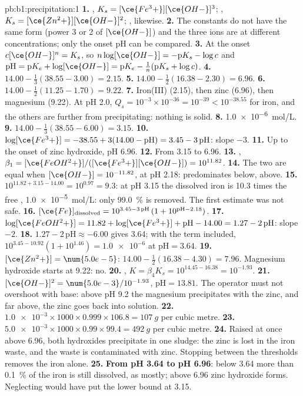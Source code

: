 \begin{solution}{pb:b1:precipitation:1}
\textbf{1.} , $K_s = [\ce{Fe^3+}][\ce{OH-}]^3$;
, $K_s = [\ce{Zn^2+}][\ce{OH-}]^2$;
, likewise.
\textbf{2.} The constants do not have the same form (power 3 or 2 of
$[\ce{OH-}]$) and the three ions are at different concentrations; only
the onset pH can be compared.
\textbf{3.} At the onset $c[\ce{OH-}]^n = K_s$, so $n\log[\ce{OH-}] =
-\mathrm{p}K_s - \log c$ and $\mathrm{pH} = \mathrm{p}K_e +
\log[\ce{OH-}] = \mathrm{p}K_e - \frac1n(\mathrm{p}K_s + \log c)$.
\textbf{4.} $14.00 - \frac13(38.55 - 3.00) = 2.15$.
\textbf{5.} $14.00 - \frac12(16.38 - 2.30) = 6.96$.
\textbf{6.} $14.00 - \frac12(11.25 - 1.70) = 9.22$.
\textbf{7.} Iron(III) (2.15), then zinc (6.96), then magnesium (9.22). At
pH 2.0, $Q_s = 10^{-3} \times 10^{-36} = 10^{-39} < 10^{-38.55}$ for iron,
and the others are further from precipitating: nothing is solid.
\textbf{8.} \qty{1.0e-6}{mol/L}.
\textbf{9.} $14.00 - \frac13(38.55 - 6.00) = 3.15$.
\textbf{10.} $\log[\ce{Fe^3+}] = -38.55 + 3(14.00 - \mathrm{pH}) = 3.45 -
3\,\mathrm{pH}$: slope $-3$.
\textbf{11.} Up to the onset of zinc hydroxide, pH 6.96.
\textbf{12.} From 3.15 to 6.96.
\textbf{13.} , $\beta_1 =
[\ce{FeOH^2+}]/([\ce{Fe^3+}][\ce{OH-}]) = 10^{11.82}$.
\textbf{14.} The two are equal when $[\ce{OH-}] = 10^{-11.82}$, at pH 2.18:
 predominates below,  above.
\textbf{15.} $10^{11.82 + 3.15 - 14.00} = 10^{0.97} = 9.3$: at pH 3.15 the
dissolved iron is 10.3 times the free , \qty{1.0e-5}{mol/L}:
only \qty{99.0}{\percent} is removed. The first estimate was not safe.
\textbf{16.} $[\ce{Fe}]_{\mathrm{dissolved}} = 10^{3.45 - 3\,\mathrm{pH}}\,
(1 + 10^{\mathrm{pH} - 2.18})$.
\textbf{17.} $\log[\ce{FeOH^2+}] = 11.82 + \log[\ce{Fe^3+}] + \mathrm{pH} -
14.00 = 1.27 - 2\,\mathrm{pH}$: slope $-2$.
\textbf{18.} $1.27 - 2\,\mathrm{pH} \approx -6.00$ gives 3.64; with the
 term included, $10^{3.45 - 10.92}(1 + 10^{1.46}) =
\num{1.0e-6}$ at $\mathrm{pH} = 3.64$.
\textbf{19.} $[\ce{Zn^2+}] = \num{5.0e-5}$: $14.00 - \frac12(16.38 - 4.30) =
7.96$. Magnesium hydroxide starts at 9.22: no.
\textbf{20.} , $K = \beta_4 K_s =
10^{14.45 - 16.38} = 10^{-1.93}$.
\textbf{21.} $[\ce{OH-}]^2 = \num{5.0e-3}/10^{-1.93}$, $\mathrm{pH} =
13.81$. The operator must not overshoot with base: above pH 9.2 the
magnesium precipitates with the zinc, and far above, the zinc goes back
into solution.
\textbf{22.} $\num{1.0e-3} \times 1000 \times 0.999 \times 106.8 =
\qty{107}{g}$ per cubic metre.
\textbf{23.} $\num{5.0e-3} \times 1000 \times 0.99 \times 99.4 =
\qty{492}{g}$ per cubic metre.
\textbf{24.} Raised at once above 6.96, both hydroxides precipitate in one
sludge: the zinc is lost in the iron waste, and the waste is
contaminated with zinc. Stopping between the thresholds removes the iron
alone.
\textbf{25.} \textbf{From pH 3.64 to pH 6.96}: below 3.64 more than
\qty{0.1}{\percent} of the iron is still dissolved, as  mostly; above
6.96 zinc hydroxide forms. Neglecting  would have put the
lower bound at 3.15.
\end{solution}
